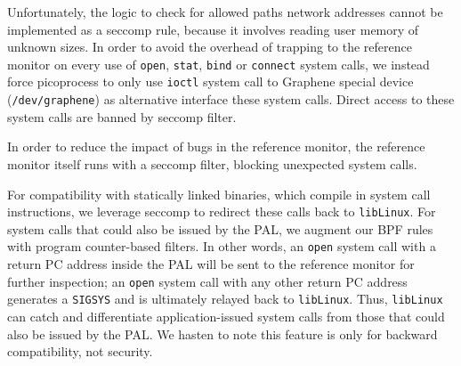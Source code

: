 Unfortunately, the logic to check for allowed paths network addresses cannot be implemented 
as a seccomp rule, because it involves reading user memory of unknown sizes. 
In order to avoid the overhead of trapping to the reference monitor on 
every use of {\tt open}, {\tt stat}, {\tt bind} or {\tt connect} system calls, we instead 
force picoprocess to only use {\tt ioctl} system call to Graphene special device ({\tt /dev/graphene}) as alternative interface these system calls. Direct access to these system calls are banned by seccomp filter.

In order to reduce the impact of bugs in the reference monitor,
the reference monitor itself runs with a seccomp filter,
blocking unexpected system calls.

\vspace{5pt}
For compatibility with statically linked binaries, which 
compile in system call instructions,
we leverage seccomp to redirect these calls 
back to {\tt libLinux}.  
For system calls that could also be issued by the PAL,
we augment our BPF rules with program counter-based filters.
In other words, an {\tt open} system call with a return PC address inside the PAL 
will be sent to the reference monitor for further inspection;
an {\tt open} system call with any other return PC address generates 
a {\tt SIGSYS} and is ultimately relayed back to {\tt libLinux}.
Thus, {\tt libLinux} can catch and differentiate application-issued system calls
from those that could also be issued by the PAL.
We hasten to note this feature is only for backward compatibility,
not security. 


\begin{comment}
We hasten to note that program counter filtering
is only provided for backwards compatibility, not security.
An attacker can compromise the PAL, so system policies are enforced
externally by the reference monitor.


Dynamically redirecting system calls to {\tt libLinux} is 
less efficient than dynamically linking against
the Graphene libc or statically compiling {\tt libLinux} into the application.
The overhead of dynamic redirection comes from 
transferring control to the kernel, then back to 
the PAL, and then to {\tt libLinux}.
We leave exploration of more efficient alternatives for future work,
such as redirecting the hardware system call table to {\tt libLinux}
on a host system like Dune~\citep{belay12dune},
or dynamically rewriting parts of the static binary~\citep{hunt99detours}.
\end{comment}


